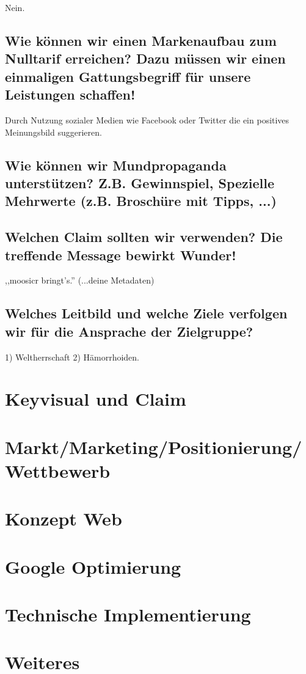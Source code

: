 \documentclass[11pt]{scrreprt}
\begin{document}
Nein.

\section{Wie können wir einen Markenaufbau zum Nulltarif
erreichen?
Dazu müssen wir einen einmaligen Gattungsbegriff
für unsere Leistungen schaffen!}

Durch Nutzung sozialer Medien wie Facebook oder Twitter die ein positives 
Meinungsbild suggerieren. 

\section{Wie können wir Mundpropaganda
unterstützen?
Z.B. Gewinnspiel, Spezielle Mehrwerte (z.B.
Broschüre mit Tipps, ...)}


\section{Welchen Claim sollten wir verwenden?
Die treffende Message bewirkt Wunder!}

,,moosicr bringt's.'' (...deine Metadaten)

\section{Welches Leitbild und welche Ziele verfolgen wir
für die Ansprache der Zielgruppe?}

1) Weltherrschaft
2) Hämorrhoiden.

\chapter{Keyvisual und Claim}

\chapter{Markt/Marketing/Positionierung/Wettbewerb}
\chapter{Konzept Web}
\chapter{Google Optimierung}

\chapter{Technische Implementierung}
\chapter{Weiteres}
\end{document}

